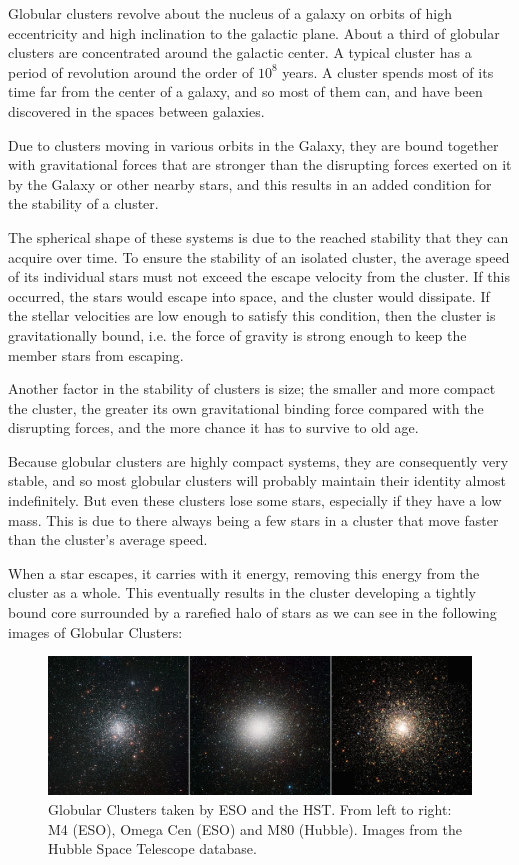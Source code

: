 Globular clusters revolve about the nucleus of a galaxy on orbits of high eccentricity and high inclination to the galactic plane. About a third of globular clusters are concentrated around the galactic center. A typical cluster has a period of revolution around the order of $ 10^{8} $ years. A cluster spends most of its time far from the center of a galaxy, and so most of them can, and have been discovered in the spaces between galaxies. 

Due to clusters moving in various orbits in the Galaxy, they are bound together with gravitational forces that are stronger than the disrupting forces exerted on it by the Galaxy or other nearby stars, and this results in an added condition for the stability of a cluster.

The spherical shape of these systems is due to the reached stability that they can acquire over time. To ensure the stability of an isolated cluster, the average speed of its individual stars must not exceed the escape velocity from the cluster. If this occurred, the stars would escape into space, and the cluster would dissipate. If the stellar velocities are low enough to satisfy this condition, then the cluster is gravitationally bound, i.e. the force of gravity is strong enough to keep the member stars from escaping.

Another factor in the stability of clusters is size; the smaller and more compact the cluster, the greater its own gravitational binding force compared with the disrupting forces, and the more chance it has to survive to old age.

Because globular clusters are highly compact systems, they are consequently very stable, and so most globular clusters will probably maintain their identity almost indefinitely. But even these clusters lose some stars, especially if they have a low mass. This is due to there always being a few stars in a cluster that move faster than the cluster's average speed.

When a star escapes, it carries with it energy, removing this energy from the cluster as a whole. This eventually results in the cluster developing a tightly bound core surrounded by a rarefied halo of stars as we can see in the following images of Globular Clusters:

\begin{figure}[H]
\centering
\includegraphics[width=14.5cm]{images/3_gcs.png}
\caption[ESO and Hubble images of Globular Clusters]{Globular Clusters taken by ESO and the HST. From left to right: M4 (ESO), Omega Cen (ESO) and M80 (Hubble). Images from the Hubble Space Telescope database.}
\end{figure}

